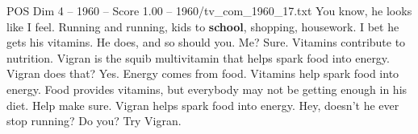 \begin{textsample}{POS Dim 4 – 1960 – Score 1.00 – 1960/tv\_com\_1960\_17.txt}  \label{ex:f4_pos_014}
You know, he looks like I feel.
Running and running, kids to \textbf{school}, shopping, housework.
I bet he gets his vitamins.
He does, and so should you.
Me?
Sure.
Vitamins contribute to nutrition.
Vigran is the squib multivitamin that helps spark food into energy.
Vigran does that?
Yes.
Energy comes from food.
Vitamins help spark food into energy.
Food provides vitamins, but everybody may not be getting enough in his diet.
Help make sure.
Vigran helps spark food into energy.
Hey, doesn't he ever stop running?
Do you?
Try Vigran.

\end{textsample}
